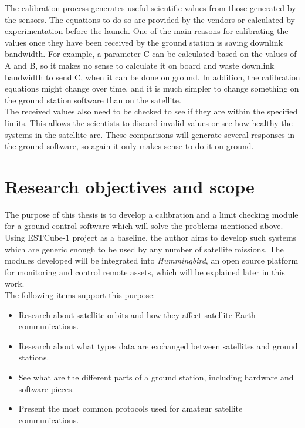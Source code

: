 The calibration process generates useful scientific values from those generated by the sensors. The equations to do so are provided by the vendors or calculated by experimentation before the launch. One of the main reasons for calibrating the values once they have been received by the ground station is saving downlink bandwidth. For example, a parameter C can be calculated based on the values of A and B, so it makes no sense to calculate it on board and waste downlink bandwidth to send C, when it can be done on ground.  In addition, the calibration equations might change over time, and it is much simpler to change something on the ground station software than on the satellite.\\


The received values also need to be checked to see if they are within the specified limits. This allows the scientists to discard invalid values or see how healthy the systems in the satellite are. These comparisons will generate several responses in the ground software, so again it only makes sense to do it on ground. 
\pagebreak

\section{Research objectives and scope}

The purpose of this thesis is to develop a calibration and a limit checking module for a ground control software which will solve the problems mentioned above.\\

Using ESTCube-1 project as a baseline, the author aims to develop such systems which are generic enough to be used by any number of satellite missions. The modules developed will be integrated into \emph{Hummingbird}, an open source platform for monitoring and control remote assets, which will be explained later in this work.\\ 
The following items support this purpose:
\begin{itemize}
	\item Research about satellite orbits and how they affect satellite-Earth communications.
	\item Research about what types data are exchanged between satellites and ground stations.
	\item See what are the different parts of a ground station, including hardware and software pieces.
	\item Present the most common protocols used for amateur satellite communications. 
\end{itemize}

